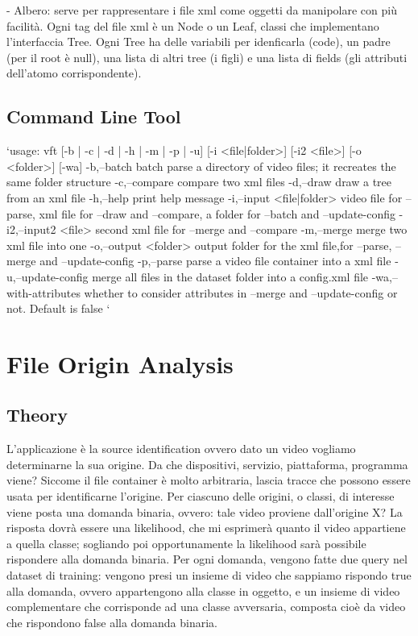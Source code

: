 - Albero:
 serve per rappresentare i file xml come oggetti da manipolare con più facilità. Ogni tag del file xml è un Node o un Leaf, classi che implementano l'interfaccia Tree. Ogni Tree ha delle variabili per idenficarla (code), un padre (per il root è null), una lista di altri tree (i figli) e una lista di fields (gli attributi dell'atomo corrispondente).

\subsection{Command Line Tool}

`usage: vft [-b | -c | -d | -h | -m | -p | -u]    [-i <file|folder>] [-i2
       <file>]  [-o <folder>]   [-wa]
 -b,--batch                 batch parse a directory of video files; it
                            recreates the same folder structure
 -c,--compare               compare two xml files
 -d,--draw                  draw a tree from an xml file
 -h,--help                  print help message
 -i,--input <file|folder>   video file for --parse, xml file for --draw
                            and --compare, a folder for --batch and
                            --update-config
 -i2,--input2 <file>        second xml file for --merge and --compare
 -m,--merge                 merge two xml file into one
 -o,--output <folder>       output folder for the xml file,for --parse,
                            --merge and --update-config
 -p,--parse                 parse a video file container into a xml file
 -u,--update-config         merge all files in the dataset folder into a
                            config.xml file
 -wa,--with-attributes      whether to consider attributes in --merge and
                            --update-config or not. Default is false
`


\section{File Origin Analysis}

\subsection{Theory}

L'applicazione è la source identification ovvero dato un video vogliamo determinarne la sua origine. Da che dispositivi, servizio, piattaforma, programma viene? Siccome il file container è molto arbitraria, lascia tracce che possono essere usata per identificarne l'origine.
Per ciascuno delle origini, o classi, di interesse viene posta una domanda binaria, ovvero: tale video proviene dall'origine X? La risposta dovrà essere una likelihood, che mi esprimerà quanto il video appartiene a quella classe; sogliando poi opportunamente la likelihood sarà possibile rispondere alla domanda binaria.
Per ogni domanda, vengono fatte due query nel dataset di training: vengono presi un insieme di video che sappiamo rispondo true alla domanda, ovvero appartengono alla classe in oggetto, e un insieme di video complementare che corrisponde ad una classe avversaria, composta cioè da video che rispondono false alla domanda binaria.

